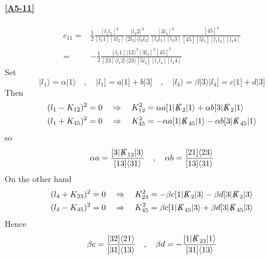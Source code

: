 \paragraph{\ref{A5-11}}
\begin{equation*}
\begin{split}
c_{11} = &
\frac{1}{2}\frac{[l_1 l_2]^3}{[l_1 1][1l_2]}
\frac{\langle l_2 2 \rangle^3}{\langle 2 l_3 \rangle\langle l_3 l_2 \rangle}
\frac{[3l_4]^3}{[l_4 l_3][l_3 3]}
\frac{[45]^4}{[45][5l_1][l_1l_4][l_4 4]}
\\
= &
-\frac{1}{2}
\frac{[l_1 1]\langle 12 \rangle^3[3l_4]^2[45]^3}{[23]\langle l_1 2 \rangle\langle 23 \rangle[5l_1][l_1l_4][l_4 4]}
\end{split}
\end{equation*}
%
Set
\begin{equation*}
|l_1\rangle = \alpha| 1\rangle \quad,\quad
|l_1] = a|1] + b|3] \quad,\quad
|l_4\rangle = \beta|3\rangle 
| l_4] = c|1] + d|3]
\end{equation*}
Then
\begin{equation*}
\begin{split}
& (l_1- K_{12})^2 = 0 \quad\Rightarrow\quad K_{12}^2 = \alpha a [1|\slashed{K}_2|1\rangle + \alpha b [3|\slashed{K}_2|1\rangle
\\
& (l_1 + K_{45})^2 = 0 \quad\Rightarrow\quad
K_{45}^2 = -\alpha a [1|\slashed{K}_{45}|1\rangle - \alpha b [3|\slashed{K}_{45}|1\rangle
\end{split}
\end{equation*}
so
\begin{equation*}
\alpha a = \frac{[3|\slashed{K}_{12}|3\rangle}{[13]\langle 31\rangle}
\quad,\quad
\alpha b = \frac{[21]\langle 23\rangle}{[13]\langle 31\rangle}
\end{equation*}
On the other hand
\begin{equation*}
\begin{split}
& (l_4 + K_{23})^2 = 0 \quad\Rightarrow\quad K_{23}^2 = -\beta c[1|\slashed{K}_2|3\rangle - \beta d [3|\slashed{K}_2|3\rangle
\\
& (l_4 - K_{45})^2 = 0 \quad\Rightarrow\quad K_{45}^2 = \beta c [1|\slashed{K}_{45}|3\rangle + \beta d [3|\slashed{K}_{45}|3\rangle
\end{split}
\end{equation*}
Hence
\begin{equation*}
\beta c = \frac{[32]\langle 21\rangle}{[31]\langle 13\rangle}
\quad,\quad
\beta d = -\frac{[1|\slashed{K}_{23}|1\rangle}{[31]\langle 13\rangle}
\end{equation*}
